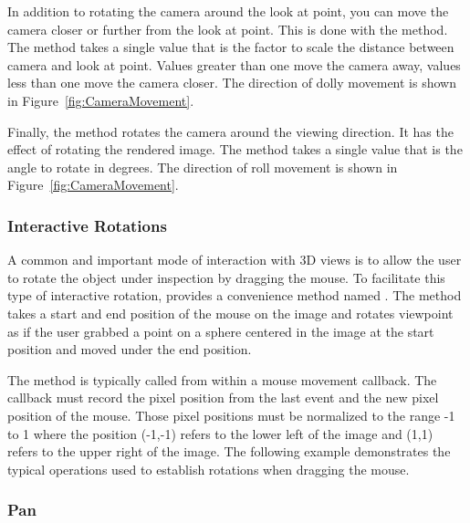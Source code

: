 In addition to rotating the camera around the look at point, you can move
the camera closer or further from the look at point. This is done with the
 method. The  method takes a single value
that is the factor to scale the distance between camera and look at point.
Values greater than one move the camera away, values less than one move the
camera closer. The direction of dolly movement is shown in
Figure~\ref{fig:CameraMovement}.

Finally, the  method rotates the camera around the viewing
direction. It has the effect of rotating the rendered image. The
 method takes a single value that is the angle to rotate in
degrees. The direction of roll movement is shown in
Figure~\ref{fig:CameraMovement}.

\subsubsection{Interactive Rotations}


A common and important mode of interaction with 3D views is to allow the
user to rotate the object under inspection by dragging the mouse. To
facilitate this type of interactive rotation, 
provides a convenience method named . The
 method takes a start and end position of the
mouse on the image and rotates viewpoint as if the user grabbed a point on
a sphere centered in the image at the start position and moved under the
end position.

The  method is typically called from within a
mouse movement callback. The callback must record the pixel position from
the last event and the new pixel position of the mouse. Those pixel
positions must be normalized to the range -1 to 1 where the position
(-1,-1) refers to the lower left of the image and (1,1) refers to the upper
right of the image. The following example demonstrates the typical
operations used to establish rotations when dragging the mouse.



\subsubsection{Pan}

